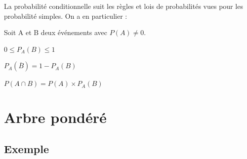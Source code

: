 \begin{brmq}
	La probabilité conditionnelle suit les règles et lois de probabilités vues pour les probabilité simples. On a en particulier :
\end{brmq}

\begin{bprop}
    Soit A et B deux événements avec $P(A)\neq 0$.
    \begin{itemProp}
    	\item $0\leq P_A(B)\leq 1$
    	\item $P_A(\overline{B})=1-P_A(B)$
    	\item $P(A \cap B)=P(A)\times P_A (B)$
    \end{itemProp}
\end{bprop}

\section{Arbre pondéré}

\subsection{Exemple}

